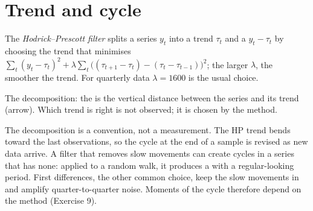 \section{Trend and cycle}\label{sec:b2:business-cycles:trend}

\begin{definition}\label{def:b2:business-cycles:hp-filter}
The \emph{Hodrick--Prescott filter} splits a series $y_t$ into a trend $\tau_t$ and a  $y_t - \tau_t$ by choosing the trend that minimises
$\sum_t(y_t - \tau_t)^2 + \lambda\sum_t\bigl((\tau_{t+1} - \tau_t) - (\tau_t - \tau_{t-1})\bigr)^2$; the larger $\lambda$, the smoother the trend. For quarterly data $\lambda = 1600$ is the usual choice.
\end{definition}

\begin{omfigure}

{\small The decomposition: the  is the vertical distance between the series and its trend (arrow). Which
trend is right is not observed; it is chosen by the method.}
\end{omfigure}

The decomposition is a convention, not a measurement. The HP trend bends toward the last observations, so the cycle at the
end of a sample is revised as new data arrive. A filter that removes slow movements can create cycles in a series that has
none: applied to a random walk, it produces a  with a regular-looking period. First differences, the
other common choice, keep the slow movements in and amplify quarter-to-quarter noise. Moments of the cycle therefore
depend on the method (Exercise 9).


